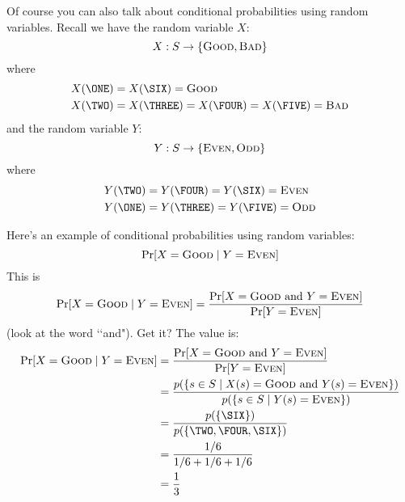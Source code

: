 

Of course you can also talk about
conditional probabilities using random variables.
Recall we have the random variable $X$:
\[
  X : S \rightarrow \{\textsc{Good}, \textsc{Bad}\}
\]
where
\begin{align*}
  X(\ONE) &= X(\SIX) = \textsc{Good} \\
  X(\TWO) &= X(\THREE) = X(\FOUR) = X(\FIVE) = \textsc{Bad}
\end{align*}
and the random variable $Y$:
\[
  Y : S \rightarrow \{ \textsc{Even}, \textsc{Odd} \}
\]
where
\begin{align*}
  Y(\TWO) &= Y(\FOUR) = Y(\SIX) = \textsc{Even} \\
  Y(\ONE) &= Y(\THREE) = Y(\FIVE) = \textsc{Odd}
\end{align*}

Here's an example of conditional probabilities
using random variables:
\[
  \Pr[X = \textsc{Good} \mid Y = \textsc{Even}]
\]
This is
\[
\Pr[X = \textsc{Good} \mid Y = \textsc{Even}]
=
\frac{ \Pr[X = \textsc{Good} \text{ and } Y = \textsc{Even}] }{ \Pr[Y = \textsc{Even}] }
\]
(look at the word \lq\lq and").
Get it?
The value is:
\begin{align*}
  \Pr[X = \textsc{Good} \mid Y = \textsc{Even}]
  &=
    \frac
    { \Pr[X = \textsc{Good} \text{ and } Y = \textsc{Even}] }
    { \Pr[Y = \textsc{Even}] }
  \\
  &=
    \frac
    { p( \{ s \in S \mid X(s) = \textsc{Good} \text{ and } Y(s) = \textsc{Even} \} ) }
    { p( \{ s \in S \mid Y(s) = \textsc{Even} \}) }
  \\
  &=
    \frac
    { p( \{ \SIX \} ) }
    { p( \{ \TWO, \FOUR, \SIX \}) }
  \\
  &=
    \frac
    { 1/6 }
    { 1/6 + 1/6 + 1/6 }
  \\
  &=
    \frac
    { 1 }
    { 3 }
\end{align*}






